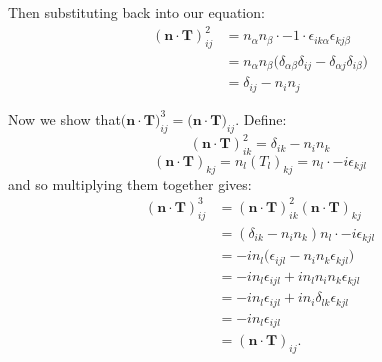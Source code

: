 \begin{enumerate}
    Then substituting back into our equation:
    \begin{align*}
        (\boldsymbol{n}\cdot\boldsymbol{T})^2_{ij}
        &=n_{\alpha}n_{\beta}\cdot -1\cdot\epsilon_{ik\alpha}\epsilon_{kj\beta} \\
        &=n_{\alpha}n_{\beta}\bigl(\delta_{\alpha\beta}\delta_{ij}
        -\delta_{\alpha j}\delta_{i\beta}\bigl) \\
        &=\delta_{ij}-n_i n_j
    \end{align*}

    \newpage

    Now we show that$\bigl(\boldsymbol{n}\cdot\boldsymbol{T}\bigl)^3_{ij}
    =\bigl(\boldsymbol{n}\cdot\boldsymbol{T}\bigl)_{ij}$. Define:
    $$(\boldsymbol{n}\cdot\boldsymbol{T})^2_{ik}
    =\delta_{ik}-n_i n_k$$
    $$(\boldsymbol{n}\cdot\boldsymbol{T})_{kj}
    =n_l(T_l)_{kj}=n_l\cdot -i\epsilon_{kjl}$$
    and so multiplying them together gives:
    \begin{align*}
        (\boldsymbol{n}\cdot\boldsymbol{T})^3_{ij}
        &=(\boldsymbol{n}\cdot\boldsymbol{T})^2_{ik}
        (\boldsymbol{n}\cdot\boldsymbol{T})_{kj} \\
        &=(\delta_{ik}-n_i n_k) n_l\cdot -i\epsilon_{kjl} \\
        &=-i n_l\bigl(\epsilon_{ijl}-n_i n_k\epsilon_{kjl}\bigl) \\
        &=-i n_l\epsilon_{ijl}+i n_l n_i n_k\epsilon_{kjl} \\
        &=-i n_l\epsilon_{ijl}+i n_i\delta_{lk}\epsilon_{kjl} \\
        &=-i n_l\epsilon_{ijl} \\
        &=(\boldsymbol{n}\cdot\boldsymbol{T})_{ij}.
    \end{align*}
    

\end{enumerate}
